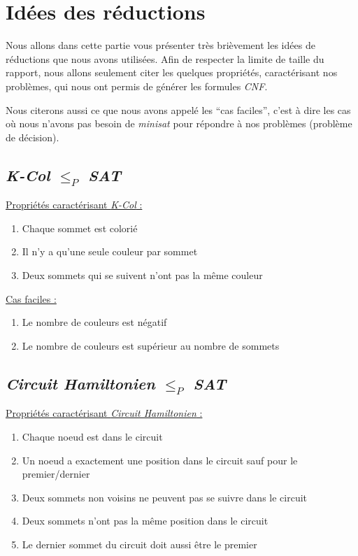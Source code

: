 \section{Idées des réductions}
 Nous allons dans cette partie vous présenter très brièvement les idées
 de réductions que nous avons utilisées. Afin de respecter la limite de
 taille du rapport, nous allons seulement citer les quelques propriétés,
 caractérisant nos problèmes, qui nous ont permis de générer les
 formules \emph{CNF}.
 
 Nous citerons aussi ce que nous avons appelé les ``cas
 faciles'', c'est à dire les cas où nous n'avons pas besoin de
 \emph{minisat} pour répondre à nos problèmes (problème de décision).

  \subsection{\emph{K-Col} $\leq_P$ \emph{SAT}}
  \underline{Propriétés caractérisant \emph{K-Col} :}
  \begin{enumerate}
   \item Chaque sommet est colorié
   \item Il n'y a qu'une seule couleur par sommet
   \item Deux sommets qui se suivent n'ont pas la même couleur
  \end{enumerate}

  \underline{Cas faciles :}
  \begin{enumerate}
   \item Le nombre de couleurs est négatif
   \item Le nombre de couleurs est supérieur au nombre de sommets
  \end{enumerate}

  \subsection{\emph{Circuit Hamiltonien} $\leq_P$ \emph{SAT}}
  \underline{Propriétés caractérisant \emph{Circuit Hamiltonien} :}
  \begin{enumerate}
   \item Chaque noeud est dans le circuit
   \item Un noeud a exactement une position dans le circuit sauf pour le
	 premier/dernier
   \item Deux sommets non voisins ne peuvent pas se suivre dans le
	 circuit
   \item Deux sommets n'ont pas la même position dans le circuit
   \item Le dernier sommet du circuit doit aussi être le premier
  \end{enumerate}


